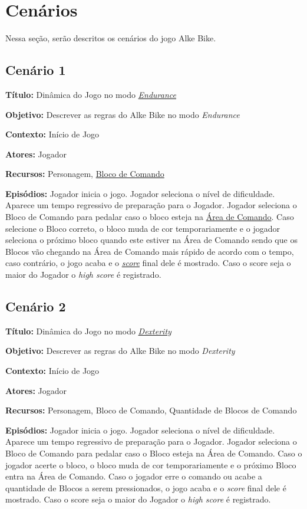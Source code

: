 \section{Cenários}

Nessa seção, serão descritos os \hypertarget{cenarios}{cenários} do jogo Alke Bike.

\subsection{Cenário 1}

\textbf{Título:} Dinâmica do Jogo no modo \hyperlink{endurance}{\textit{Endurance}}

\textbf{Objetivo:} Descrever as regras do Alke Bike no modo \textit{Endurance}

\textbf{Contexto:} Início de Jogo

\textbf{Atores:} Jogador

\textbf{Recursos:} Personagem, \hyperlink{blocoDeComando}{Bloco de Comando}

\textbf{Episódios:} Jogador inicia o jogo. Jogador seleciona o nível de dificuldade. Aparece um tempo regressivo de preparação para o Jogador. Jogador seleciona o Bloco de Comando para pedalar caso o bloco esteja na \hyperlink{areaDeComando}{Área de Comando}. Caso selecione o Bloco correto, o bloco muda de cor temporariamente e o jogador seleciona o próximo bloco quando este estiver na Área de Comando sendo que os Blocos vão chegando na Área de Comando mais rápido de acordo com o tempo, caso contrário, o jogo acaba e o \hyperlink{score}{\textit{score}} final dele é mostrado. Caso o score seja o maior do Jogador o \textit{high score} é registrado.

\subsection{Cenário 2}

\textbf{Título:} Dinâmica do Jogo no modo \hyperlink{dexterity}{\textit{Dexterity}}

\textbf{Objetivo:} Descrever as regras do Alke Bike no modo \textit{Dexterity}

\textbf{Contexto:} Início de Jogo

\textbf{Atores:} Jogador

\textbf{Recursos:} Personagem, Bloco de Comando, Quantidade de Blocos de Comando

\textbf{Episódios:} Jogador inicia o jogo. Jogador seleciona o nível de dificuldade. Aparece um tempo regressivo de preparação para o Jogador. Jogador seleciona o Bloco de Comando para pedalar caso o Bloco esteja na Área de Comando. Caso o jogador acerte o bloco, o bloco muda de cor temporariamente e o próximo Bloco entra na Área de Comando. Caso o jogador erre o comando ou acabe a quantidade de Blocos a serem pressionados, o jogo acaba e o \textit{score} final dele é mostrado. Caso o score seja o maior do Jogador o \textit{high score} é registrado.

